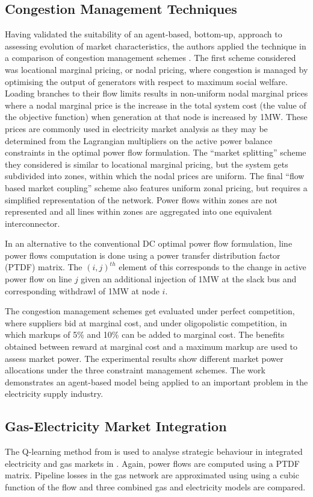 \subsection{Congestion Management Techniques}
Having validated the suitability of an agent-based, bottom-up, approach to
assessing evolution of market characteristics, the authors applied the technique
in a comparison of congestion management schemes \cite{krause:cong}.  The first
scheme considered was locational marginal pricing, or nodal pricing,
where congestion is managed by optimising the output of generators with respect to
maximum social welfare.  Loading branches to their flow limits results in
non-uniform nodal marginal prices where a nodal marginal price is the
increase in the total system cost (the value of the objective function) when
generation at that node is increased by 1MW.  These prices are commonly used in
electricity market analysis as they may be determined from the Lagrangian
multipliers on the active power balance constraints in the optimal power flow
formulation.  The ``market splitting'' scheme they considered is
similar to locational marginal pricing, but the system gets subdivided into
zones, within which the nodal prices are uniform.  The final ``flow based
market coupling'' scheme also features uniform zonal pricing, but requires a
simplified representation of the network.  Power flows within zones are not
represented and all lines within zones are aggregated into one equivalent
interconnector.

In an alternative to the conventional DC optimal power flow formulation, line
power flows computation is done using a power transfer distribution
factor (PTDF) matrix.  The $(i,j)^{th}$ element of this corresponds to
the change in active power flow on line $j$ given an additional injection of
1MW at the slack bus and corresponding withdrawl of 1MW at node $i$.

The congestion management schemes get evaluated under perfect competition,
where suppliers bid at marginal cost, and under oligopolistic competition, in
which markups of 5\% and 10\% can be added to marginal cost.  The benefits
obtained between reward at marginal cost and a maximum markup are used to
assess market power.  The experimental results show different market power
allocations under the three constraint management schemes.  The work
demonstrates an agent-based model being applied to an important problem in the
electricity supply industry.

\subsection{Gas-Electricity Market Integration}
The Q-learning method from \cite{krause:nash04,krause:nash06} is used to
analyse strategic behaviour in integrated electricity and gas markets in
\cite{krause:gas}.  Again, power flows are computed using a PTDF matrix.
Pipeline losses in the gas network are approximated using using a cubic
function of the flow and three combined gas and electricity models are
compared.

